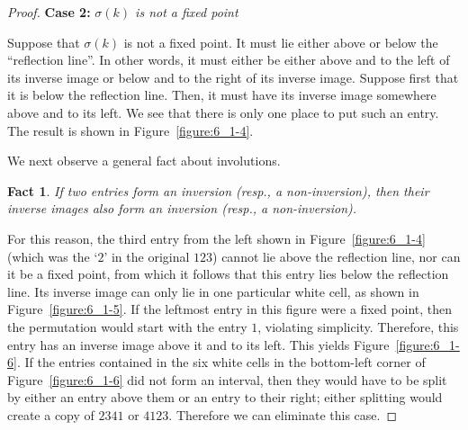 \documentclass[10pt]{article}
\theoremstyle{plain}
\newtheorem{fact}[theorem]{Fact}
\begin{document}
\begin{proof}
	\bigskip
	
	\textbf{Case 2:} \emph{$\sigma(k)$ is not a fixed point}
	
	Suppose that $\sigma(k)$ is not a fixed point. It must lie either above or below the ``reflection line''. In other words, it must either be either above and to the left of its inverse image or below and to the right of its inverse image. Suppose first that it is below the reflection line. Then, it must have its inverse image somewhere above and to its left. We see that there is only one place to put such an entry. The result is shown in Figure~\ref{figure:6_1-4}.
	
	We next observe a general fact about involutions.
	
	\begin{fact}
	\label{fact:inv-img}
	If two entries form an inversion (resp., a non-inversion), then their inverse images also form an inversion (resp., a non-inversion).
	\end{fact}
	
	For this reason, the third entry from the left shown in Figure~\ref{figure:6_1-4} (which was the `$2$' in the original $123$) cannot lie above the reflection line, nor can it be a fixed point, from which it follows that this entry lies below the reflection line. Its inverse image can only lie in one particular white cell, as shown in Figure~\ref{figure:6_1-5}. If the leftmost entry in this figure were a fixed point, then the permutation would start with the entry $1$, violating simplicity. Therefore, this entry has an inverse image above it and to its left. This yields Figure~\ref{figure:6_1-6}. If the entries contained in the six white cells in the bottom-left corner of Figure~\ref{figure:6_1-6} did not form an interval, then they would have to be split by either an entry above them or an entry to their right; either splitting would create a copy of $2341$ or $4123$. Therefore we can eliminate this case.
		

\end{proof}
\end{document}
